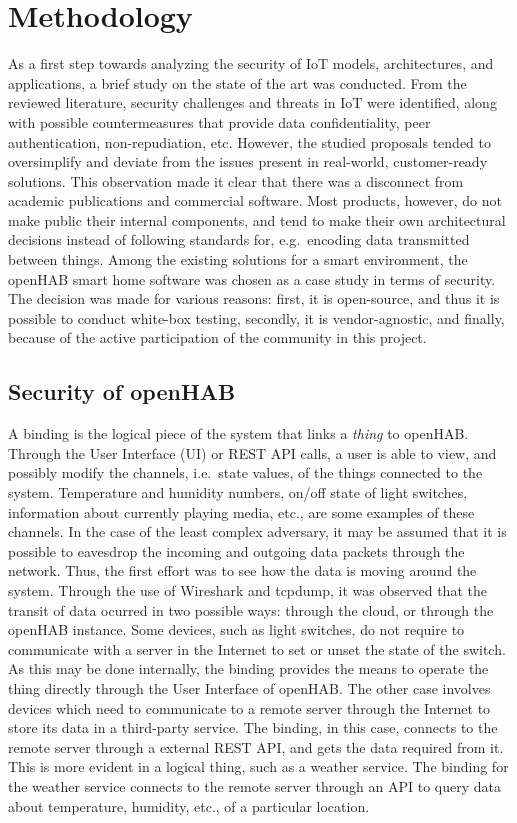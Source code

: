 \documentclass[12pt]{article}
\newcommand{\TODO}{\todo[inline]}
\begin{document}
\newpage
\section{Methodology}
\label{sec:method}
\TODO{SUMMARY}
As a first step towards analyzing the security of IoT models, architectures, and applications, a brief study on the state of the art was conducted. From the reviewed literature, security challenges and threats in IoT were identified, along with possible countermeasures that provide data confidentiality, peer authentication, non-repudiation, etc. However, the studied proposals tended to oversimplify and deviate from the issues present in real-world, customer-ready solutions. This observation made it clear that there was a disconnect from academic publications and commercial software. Most products, however, do not make public their internal components, and tend to make their own architectural decisions instead of following standards for, e.g.\ encoding data transmitted between things. Among the existing solutions for a smart environment, the openHAB smart home software was chosen as a case study in terms of security. The decision was made for various reasons: first, it is open-source, and thus it is possible to conduct white-box testing, secondly, it is vendor-agnostic, and finally, because of the active participation of the community in this project.

\subsection{Security of openHAB}

A binding is the logical piece of the system that links a \emph{thing} to openHAB. Through the User Interface (UI) or REST API calls, a user is able to view, and possibly modify the channels, i.e.\ state values, of the things connected to the system. Temperature and humidity numbers, on/off state of light switches, information about currently playing media, etc., are some examples of these channels. In the case of the least complex adversary, it may be assumed that it is possible to eavesdrop the incoming and outgoing data packets through the network. Thus, the first effort was to see how the data is moving around the system. Through the use of Wireshark and tcpdump, it was observed that the transit of data ocurred in two possible ways: through the cloud, or through the openHAB instance. Some devices, such as light switches, do not require to communicate with a server in the Internet to set or unset the state of the switch. As this may be done internally, the binding provides the means to operate the thing directly through the User Interface of openHAB. The other case involves devices which need to communicate to a remote server through the Internet to store its data in a third-party service. The binding, in this case, connects to the remote server through a external REST API, and gets the data required from it. This is more evident in a logical thing, such as a weather service. The binding for the weather service connects to the remote server through an API to query data about temperature, humidity, etc., of a particular location.
\end{document}
